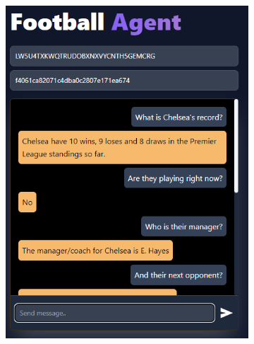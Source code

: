 \documentclass[10pt,a4paper,twocolumn]{article}
\begin{document}
\begin{figure}
    \centering
    \begin{subfigure}[b]{0.4772\textwidth}
        \centering
        \includegraphics[width=\textwidth]{assets/Screenshot_7.png}
    \end{subfigure}
    \hfill
    \begin{subfigure}[b]{0.48\textwidth}
        \centering

\end{subfigure}
\end{figure}
\end{document}
